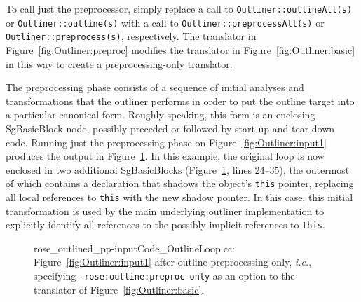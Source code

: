 To call just the preprocessor, simply replace a call to
\texttt{Outliner::outlineAll(s)} or
\texttt{Outliner::outline(s)} with a call to
\texttt{Outliner::preprocessAll(s)} or
\texttt{Outliner::preprocess(s)}, respectively. The translator in
Figure~\ref{fig:Outliner:preproc} modifies the translator in
Figure~\ref{fig:Outliner:basic} in this way to create a
preprocessing-only translator.

The preprocessing phase consists of a sequence of initial analyses and
transformations that the outliner performs in order to put the
outline target into a particular canonical form. Roughly speaking,
this form is an enclosing SgBasicBlock node, possibly preceded or
followed by start-up and tear-down code. Running just the
preprocessing phase on Figure~\ref{fig:Outliner:input1} produces
the output in Figure~\ref{fig:Outliner:preproc1}. In this example,
the original loop is now enclosed in two additional SgBasicBlocks
(Figure~\ref{fig:Outliner:preproc1}, lines 24--35), the outermost
of which contains a declaration that shadows the object's
\texttt{this} pointer, replacing all local references to \texttt{this}
with the new shadow pointer. In this case, this initial transformation
is used by the main underlying outliner implementation to explicitly
identify all references to the possibly implicit references to
\texttt{this}.

\begin{figure}[!h]
{\indent
{\mySmallFontSize
\begin{latexonly}
   
\end{latexonly}
\begin{htmlonly}
   
\end{htmlonly}

}
}
\caption{rose\_outlined\_pp-inputCode\_OutlineLoop.cc:
Figure~\ref{fig:Outliner:input1} after outline preprocessing only,
\emph{i.e.}, specifying \texttt{-rose:outline:preproc-only} as an
option to the translator of Figure~\ref{fig:Outliner:basic}.}
\label{fig:Outliner:preproc1}
\end{figure}

